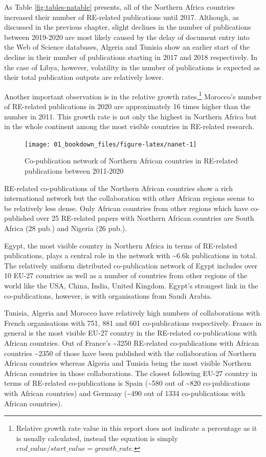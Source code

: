 \documentclass[
]{book}
\begin{document}
As Table \ref{fig:tables-natable}
presents, all of the Northern Africa countries increased their number of RE-related
publications until 2017. Although, as discussed in the previous chapter, slight declines in the number of publications between 2019-2020 are most likely caused by the delay of document entry into the Web of Science databases, Algeria and Tunisia show an earlier start of
the decline in their number of publications starting in 2017 and 2018 respectively. In the
case of Libya, however, volatility in the number of publications
is expected as their total publication outputs are relatively lower.

Another important observation is in the relative growth rates,\footnote{Relative growth rate value in this report does not indicate a percentage as
  it is usually calculated, instead the equation is simply \(end\_value/start\_value = growth\_rate\).} Morocco's number of
RE-related publications in 2020 are approximately 16 times higher than the number in 2011.
This growth rate is not only the highest in Northern Africa but in the whole continent among the most visible countries in RE-related research.

\begin{figure}
\texttt{[image: 01\_bookdown\_files/figure-latex/nanet-1]} \caption{Co-publication network of Northern African countries in RE-related publications between 2011-2020}\label{fig:nanet}
\end{figure}

RE-related co-publications of the Northern African countries show a rich international network but the collaboration with other African regions seems to be relatively less dense. Only African countries from other regions which have co-published over 25 RE-related papers with Northern African countries are South Africa (28 pub.) and Nigeria (26 pub.).

Egypt, the most visible country in Northern Africa in terms of RE-related publications, plays a central role in the network with \textasciitilde6.6k publications in total. The relatively uniform distributed co-publication network of Egypt includes over 10 EU-27 countries as well as a number of countries from other regions of the world like the USA, China, India, United Kingdom. Egypt's strongest link in the co-publications, however, is with organisations from Saudi Arabia.

Tunisia, Algeria and Morocco have relatively high numbers of collaborations with French organisations with 751, 881 and 601 co-publications respectively. France in general is the most visible EU-27 country in the RE-related co-publications with African countries. Out of France's \textasciitilde3250 RE-related co-publications with African countries \textasciitilde2350 of those have been published with the collaboration of Northern African countries whereas Algeria and Tunisia being the most visible Northern African countries in those collaborations. The closest following EU-27 country in terms of RE-related co-publications is Spain (\textasciitilde580 out of \textasciitilde820 co-publications with African countries) and Germany (\textasciitilde490 out of 1334 co-publications with African countries).
\end{document}
